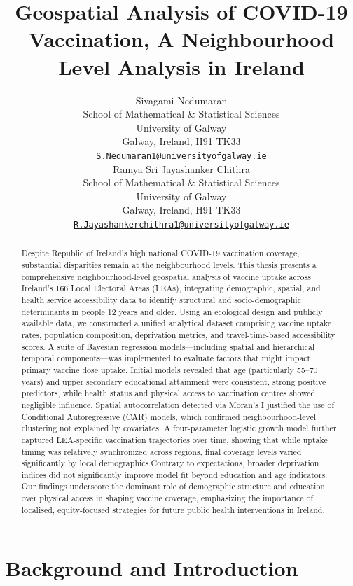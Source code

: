 \documentclass{article}
\title{Geospatial Analysis of COVID-19 Vaccination, A Neighbourhood
Level Analysis in Ireland}
\author{
    Sivagami Nedumaran
   \\
    School of Mathematical \& Statistical Sciences \\
    University of Galway \\
  Galway, Ireland, H91 TK33 \\
  \texttt{\href{mailto:S.Nedumaran1@universityofgalway.ie}{\nolinkurl{S.Nedumaran1@universityofgalway.ie}}} \\
   \And
    Ramya Sri Jayashanker Chithra
   \\
    School of Mathematical \& Statistical Sciences \\
    University of Galway \\
  Galway, Ireland, H91 TK33 \\
  \texttt{\href{mailto:R.Jayashankerchithra1@universityofgalway.ie}{\nolinkurl{R.Jayashankerchithra1@universityofgalway.ie}}} \\
  }
\begin{document}
\maketitle


\begin{abstract}
Despite Republic of Ireland's high national COVID-19 vaccination
coverage, substantial disparities remain at the neighbourhood levels.
This thesis presents a comprehensive neighbourhood-level geospatial
analysis of vaccine uptake across Ireland's 166 Local Electoral Areas
(LEAs), integrating demographic, spatial, and health service
accessibility data to identify structural and socio-demographic
determinants in people 12 years and older. Using an ecological design
and publicly available data, we constructed a unified analytical dataset
comprising vaccine uptake rates, population composition, deprivation
metrics, and travel-time-based accessibility scores. A suite of Bayesian
regression models---including spatial and hierarchical temporal
components---was implemented to evaluate factors that might impact
primary vaccine dose uptake. Initial models revealed that age
(particularly 55--70 years) and upper secondary educational attainment
were consistent, strong positive predictors, while health status and
physical access to vaccination centres showed negligible influence.
Spatial autocorrelation detected via Moran's I justified the use of
Conditional Autoregressive (CAR) models, which confirmed
neighbourhood-level clustering not explained by covariates. A
four-parameter logistic growth model further captured LEA-specific
vaccination trajectories over time, showing that while uptake timing was
relatively synchronized across regions, final coverage levels varied
significantly by local demographics.Contrary to expectations, broader
deprivation indices did not significantly improve model fit beyond
education and age indicators. Our findings underscore the dominant role
of demographic structure and education over physical access in shaping
vaccine coverage, emphasizing the importance of localised,
equity-focused strategies for future public health interventions in
Ireland.
\end{abstract}


\section{Background and Introduction}\label{background-and-introduction}
\end{document}
